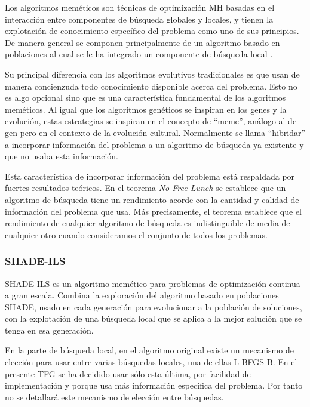 Los algoritmos meméticos son técnicas de optimización MH basadas en el interacción entre componentes de búsqueda globales y locales, y tienen la explotación de conocimiento específico del problema como uno de sus principios. De manera general se componen principalmente de un algoritmo basado en poblaciones al cual se le ha integrado un componente de búsqueda local \cite{mhhandbook}.

Su principal diferencia con los algoritmos evolutivos tradicionales es que usan de manera concienzuda todo conocimiento disponible acerca del problema. Esto no es algo opcional sino que es una característica fundamental de los algoritmos meméticos. Al igual que los algoritmos genéticos se inspiran en los genes y la evolución, estas estrategias se inspiran en el concepto de ``meme'', análogo al de gen pero en el contexto de la evolución cultural. Normalmente se llama ``hibridar'' a incorporar información del problema a un algoritmo de búsqueda ya existente y que no usaba esta información.

Esta característica de incorporar información del problema está respaldada por fuertes resultados teóricos. En el teorema \textit{No Free Lunch} \cite{nofreelunch} se establece que un algoritmo de búsqueda tiene un rendimiento acorde con la cantidad y calidad de información del problema que usa. Más precisamente, el teorema establece que el rendimiento de cualquier algoritmo de búsqueda es indistinguible de media de cualquier otro cuando consideramos el conjunto de todos los problemas. 

\subsubsection{SHADE-ILS}
\label{sec:shade-ils}


SHADE-ILS \cite{shadeils} es un algoritmo memético para problemas de optimización continua a gran escala. Combina la exploración del algoritmo basado en poblaciones SHADE, usado en cada generación para evolucionar a la población de soluciones, con la explotación de una búsqueda local que se aplica a la mejor solución que se tenga en esa generación. 

En la parte de búsqueda local, en el algoritmo original existe un mecanismo de elección para usar entre varias búsquedas locales, una de ellas L-BFGS-B. En el presente TFG se ha decidido usar sólo esta última, por facilidad de implementación y porque usa más información específica del problema. Por tanto no se detallará este mecanismo de elección entre búsquedas.

